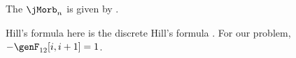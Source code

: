 
\renewcommand\period[1]{{\ensuremath{n_{#1}}}}

The {\jacobianOrb} $\jMorb_\period{}$ is given by .

Hill's formula here is the discrete Hill's formula
.
For our problem, $-\genF_{12}[i,i+1] = 1$.

\renewcommand\period[1]{{\ensuremath{T_{#1}}}}


\medskip

